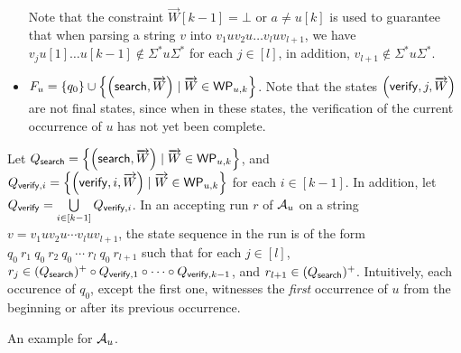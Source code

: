 \begin{definition}
\begin{itemize}
\begin{itemize}
	\end{itemize}
Note that the constraint $\overrightarrow{W}[k-1] = \bot$ or $a \neq u[k]$ is used to guarantee that when parsing a string $v$ into $v_1 u v_2 u \dots v_{l} u v_{l+1}$, we have $v_j u[1] \dots u[k-1] \not \in \Sigma^\ast u \Sigma^\ast$ for each $j \in [l]$, in addition, $v_{l+1} \not \in  \Sigma^\ast u \Sigma^\ast$.
	\item $F_u= \left\{q_0 \right\} \cup \left\{\left(\mathsf{search}, \overrightarrow{W} \right) \mid \overrightarrow{W} \in \mathsf{WP}_{u, k} \right\} $. Note that the states $\left(\mathsf{verify}, j, \overrightarrow{W} \right)$ are not final states, since when in these states, the verification of the current occurrence of $u$ has not yet been complete.
\end{itemize}
\end{definition}

Let $Q_{\mathsf{search}}  = \left\{ \left(\mathsf{search}, \overrightarrow{W} \right) \mid \overrightarrow{W} \in \mathsf{WP}_{u,k} \right\}$,  and $Q_{\mathsf{verify}, i} = \left\{ \left(\mathsf{verify}, i, \overrightarrow{W} \right) \mid \overrightarrow{W} \in \mathsf{WP}_{u,k} \right\}$ for each $i \in [k-1]$. In addition, let $Q_{\mathsf{verify}} = \bigcup \limits_{i \in [k-1]} Q_{\mathsf{verify},i}$.
In an accepting run $r$ of $\mathcal{A}_u$ on a string $v = v_1 u v_2 u \cdots v_l u v_{l+1}$, the state sequence in the run is of the form 
$q_0\ r_1\ q_0\ r_2\ q_0\ \cdots\ r_l\ q_0\ r_{l+1}$
such that  for each $j \in [l]$, $r_j \in (Q_{\mathsf{search}})^+ \circ Q_{\mathsf{verify}, 1} \circ \cdots  \circ Q_{\mathsf{verify}, k-1}$, and $r_{l+1} \in (Q_{\mathsf{search}})^+$. Intuitively, each occurence of $q_0$, except the first one, witnesses the \emph{first} occurrence of $u$ from the beginning or after its previous occurrence.


\begin{example}
	An example for $\mathcal{A}_u$.
\end{example}

